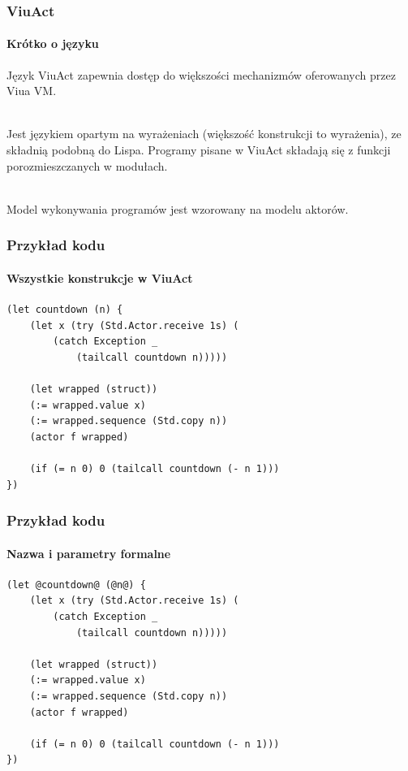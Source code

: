 \documentclass{beamer}
\begin{document}
\begin{frame}
    \frametitle{ViuAct}
    \framesubtitle{Krótko o języku}

    Język ViuAct zapewnia dostęp do większości mechanizmów oferowanych przez Viua VM.

    ~\\

    Jest językiem opartym na wyrażeniach (większość konstrukcji to wyrażenia), ze składnią podobną do Lispa.
    Programy pisane w ViuAct składają się z funkcji porozmieszczanych w modułach.

    ~\\

    Model wykonywania programów jest wzorowany na modelu aktorów.
\end{frame}

\begin{frame}[fragile]
    \frametitle{Przykład kodu}
    \framesubtitle{Wszystkie konstrukcje w ViuAct}

    \begin{small}
    \begin{lstlisting}
(let countdown (n) {
    (let x (try (Std.Actor.receive 1s) (
        (catch Exception _
            (tailcall countdown n)))))

    (let wrapped (struct))
    (:= wrapped.value x)
    (:= wrapped.sequence (Std.copy n))
    (actor f wrapped)

    (if (= n 0) 0 (tailcall countdown (- n 1)))
})
    \end{lstlisting}
    \end{small}
\end{frame}

\begin{frame}[fragile]
    \frametitle{Przykład kodu}
    \framesubtitle{Nazwa i parametry formalne}

    \begin{small}
    \begin{lstlisting}
(let @countdown@ (@n@) {
    (let x (try (Std.Actor.receive 1s) (
        (catch Exception _
            (tailcall countdown n)))))

    (let wrapped (struct))
    (:= wrapped.value x)
    (:= wrapped.sequence (Std.copy n))
    (actor f wrapped)

    (if (= n 0) 0 (tailcall countdown (- n 1)))
})
    \end{lstlisting}
    \end{small}
\end{frame}
\end{document}
